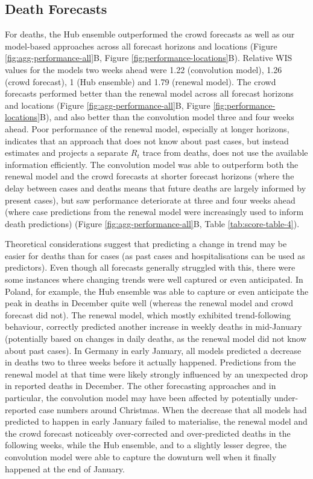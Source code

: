 \documentclass[
]{article}
\begin{document}
\hypertarget{death-forecasts}{%
\subsection{Death Forecasts}\label{death-forecasts}}

For deaths, the Hub ensemble outperformed the crowd forecasts as well as our model-based approaches across all forecast horizons and locations (Figure \ref{fig:agg-performance-all}B, Figure \ref{fig:performance-locations}B). Relative WIS values for the models two weeks ahead were 1.22 (convolution model), 1.26 (crowd forecast), 1 (Hub ensemble) and 1.79 (renewal model). The crowd forecasts performed better than the renewal model across all forecast horizons and locations (Figure \ref{fig:agg-performance-all}B, Figure \ref{fig:performance-locations}B), and also better than the convolution model three and four weeks ahead. Poor performance of the renewal model, especially at longer horizons, indicates that an approach that does not know about past cases, but instead estimates and projects a separate \(R_t\) trace from deaths, does not use the available information efficiently. The convolution model was able to outperform both the renewal model and the crowd forecasts at shorter forecast horizons (where the delay between cases and deaths means that future deaths are largely informed by present cases), but saw performance deteriorate at three and four weeks ahead (where case predictions from the renewal model were increasingly used to inform death predictions) (Figure \ref{fig:agg-performance-all}B, Table \ref{tab:score-table-4}).

Theoretical considerations suggest that predicting a change in trend may be easier for deaths than for cases (as past cases and hospitalisations can be used as predictors). Even though all forecasts generally struggled with this, there were some instances where changing trends were well captured or even anticipated. In Poland, for example, the Hub ensemble was able to capture or even anticipate the peak in deaths in December quite well (whereas the renewal model and crowd forecast did not). The renewal model, which mostly exhibited trend-following behaviour, correctly predicted another increase in weekly deaths in mid-January (potentially based on changes in daily deaths, as the renewal model did not know about past cases). In Germany in early January, all models predicted a decrease in deaths two to three weeks before it actually happened. Predictions from the renewal model at that time were likely strongly influenced by an unexpected drop in reported deaths in December. The other forecasting approaches and in particular, the convolution model may have been affected by potentially under-reported case numbers around Christmas. When the decrease that all models had predicted to happen in early January failed to materialise, the renewal model and the crowd forecast noticeably over-corrected and over-predicted deaths in the following weeks, while the Hub ensemble, and to a slightly lesser degree, the convolution model were able to capture the downturn well when it finally happened at the end of January.
\end{document}
